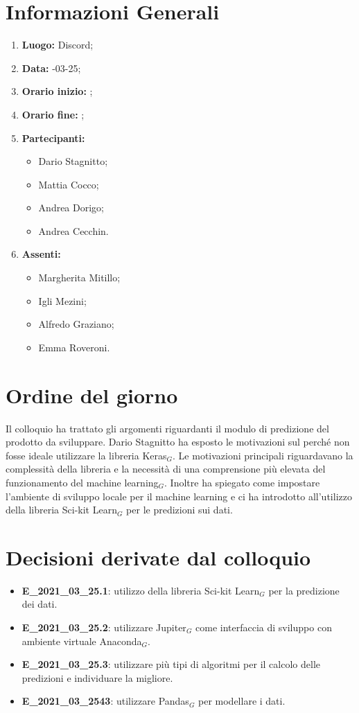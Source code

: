 \newpage
\section{Informazioni Generali}
\begin{enumerate}
	\item \textbf{Luogo:} \normalfont Discord;
	\item \textbf{Data:} -03-25;
	\item \textbf{Orario inizio:} ;
	\item \textbf{Orario fine:} ;
	\item \textbf{Partecipanti:}
	\begin{itemize}
		\item Dario Stagnitto;
		\item Mattia Cocco;
		\item Andrea Dorigo;
		\item Andrea Cecchin.
	\end{itemize}
	\item \textbf{Assenti:}
	\begin{itemize}
		\item Margherita Mitillo;
		\item Igli Mezini;
		\item Alfredo Graziano;
		\item Emma Roveroni.
	\end{itemize}
\end{enumerate}
\section{Ordine del giorno}
Il colloquio ha trattato gli argomenti riguardanti il modulo di predizione del prodotto da sviluppare. Dario Stagnitto ha esposto le motivazioni sul perché non fosse ideale utilizzare la libreria Keras$_G$.
Le motivazioni principali riguardavano la complessità della libreria e la necessità di una comprensione più elevata del funzionamento del machine learning$_G$.
Inoltre ha spiegato come impostare l'ambiente di sviluppo locale per il machine learning e ci ha introdotto all'utilizzo della libreria Sci-kit Learn$_G$ per le predizioni sui dati.
\section{Decisioni derivate dal colloquio}
\begin{itemize}
	\item \textbf{E\_2021\_03\_25.1}: utilizzo della libreria Sci-kit Learn$_G$ per la predizione dei dati.
	\item \textbf{E\_2021\_03\_25.2}: utilizzare Jupiter$_G$ come interfaccia di sviluppo con ambiente virtuale Anaconda$_G$.
	\item \textbf{E\_2021\_03\_25.3}: utilizzare più tipi di algoritmi per il calcolo delle predizioni e individuare la migliore.
	\item \textbf{E\_2021\_03\_2543}: utilizzare Pandas$_G$ per modellare i dati.
\end{itemize}